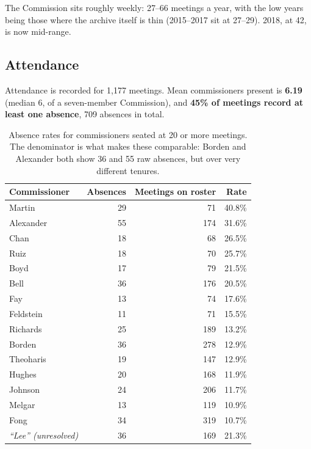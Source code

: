 \documentclass[11pt]{article}
\begin{document}
The Commission sits roughly weekly: 27--66 meetings a year, with the low years being those
where the archive itself is thin (2015--2017 sit at 27--29). 2018, at 42, is now mid-range.

\subsection{Attendance}

Attendance is recorded for 1{,}177 meetings. Mean commissioners present is \textbf{6.19}
(median 6, of a seven-member Commission), and \textbf{45\% of meetings record at least one
absence}, 709 absences in total.

\begin{table}[h]
\centering
\begin{tabular}{lrrr}
\toprule
Commissioner & Absences & Meetings on roster & Rate \\
\midrule
Martin           & 29 &  71 & 40.8\% \\
Alexander        & 55 & 174 & 31.6\% \\
Chan             & 18 &  68 & 26.5\% \\
Ruiz             & 18 &  70 & 25.7\% \\
Boyd             & 17 &  79 & 21.5\% \\
Bell             & 36 & 176 & 20.5\% \\
Fay              & 13 &  74 & 17.6\% \\
Feldstein        & 11 &  71 & 15.5\% \\
Richards         & 25 & 189 & 13.2\% \\
Borden           & 36 & 278 & 12.9\% \\
Theoharis        & 19 & 147 & 12.9\% \\
Hughes           & 20 & 168 & 11.9\% \\
Johnson          & 24 & 206 & 11.7\% \\
Melgar           & 13 & 119 & 10.9\% \\
Fong             & 34 & 319 & 10.7\% \\
\midrule
\emph{``Lee'' (unresolved)} & 36 & 169 & 21.3\% \\
\bottomrule
\end{tabular}
\caption{Absence rates for commissioners seated at 20 or more meetings. The denominator is
what makes these comparable: Borden and Alexander both show 36 and 55 raw absences, but over
very different tenures.}
\end{table}
\end{document}

